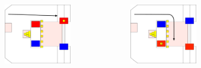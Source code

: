 \documentclass{beamer}
\begin{document}
\begin{frame}
\begin{columns}
\begin{figure}
  \end{figure}
  \begin{figure}
   \includegraphics[scale=0.15]{assets/paths/12_LL}
  \end{figure}
  \begin{figure}
   \includegraphics[scale=0.15]{assets/paths/12_RR}
  \end{figure}
 \end{columns}
\end{frame}
\end{document}
